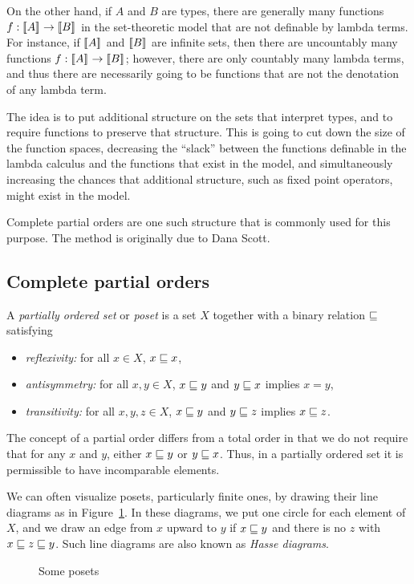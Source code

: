 \documentclass{article}
\begin{document}
On the other hand, if $A$ and $B$ are types, there are generally many
functions $f:[\![A]\!]_{}\to[\![B]\!]_{}$ in the set-theoretic model that are
not definable by lambda terms. For instance, if $[\![A]\!]_{}$ and
$[\![B]\!]_{}$ are infinite sets, then there are uncountably many
functions $f:[\![A]\!]_{}\to[\![B]\!]_{}$; however, there are only countably
many lambda terms, and thus there are necessarily going to be
functions that are not the denotation of any lambda term.

The idea is to put additional structure on the sets that interpret
types, and to require functions to preserve that structure. This is
going to cut down the size of the function spaces, decreasing the
``slack'' between the functions definable in the lambda calculus and
the functions that exist in the model, and simultaneously increasing
the chances that additional structure, such as fixed point operators,
might exist in the model.

Complete partial orders are one such structure that is commonly used
for this purpose. The method is originally due to Dana Scott.

\subsection{Complete partial orders}

\begin{definition}
  A {\em partially ordered set} or {\em poset} is a set $X$ together
  with a binary relation $\sqsubseteq$ satisfying
  \begin{itemize}
  \item {\em reflexivity:} for all $x\in X$, $x\sqsubseteq x$,
  \item {\em antisymmetry:} for all $x,y\in X$, $x\sqsubseteq y$ and $y\sqsubseteq
    x$ implies $x=y$,
  \item {\em transitivity:} for all $x,y,z\in X$, $x\sqsubseteq y$ and
    $y\sqsubseteq z$ implies $x\sqsubseteq z$.
  \end{itemize}
\end{definition}

The concept of a partial order differs from a total order in that we
do not require that for any $x$ and $y$, either $x\sqsubseteq y$ or $y\sqsubseteq
x$. Thus, in a partially ordered set it is permissible to have
incomparable elements.

We can often visualize posets, particularly finite ones, by drawing
their line diagrams as in Figure~\ref{fig-posets}. In these diagrams,
we put one circle for each element of $X$, and we draw an edge from
$x$ upward to $y$ if $x\sqsubseteq y$ and there is no $z$ with $x\sqsubseteq
z\sqsubseteq y$. Such line diagrams are also known as {\em Hasse diagrams}.
\begin{figure}
\begin{center}

\end{center}
\caption{Some posets}\label{fig-posets}
\end{figure}
\end{document}
